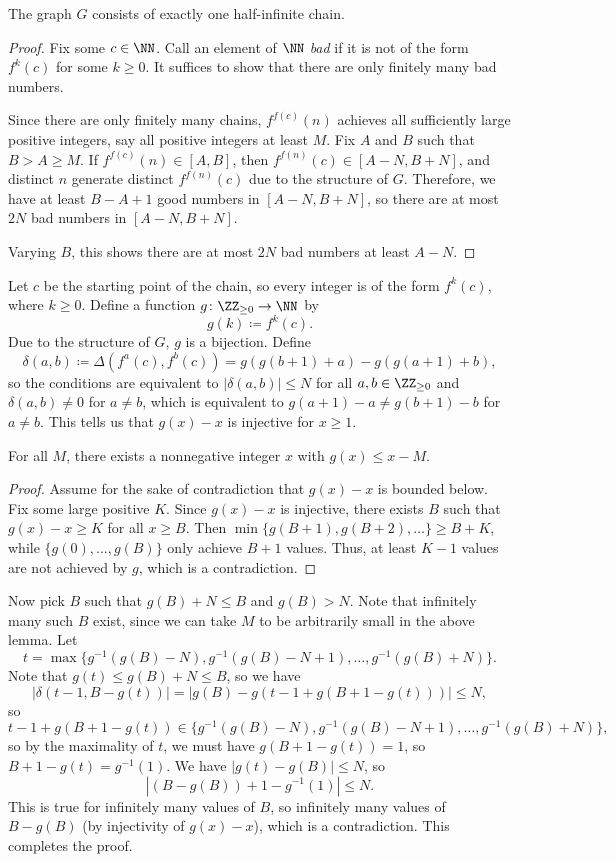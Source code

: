 \documentclass[11pt]{scrartcl}
\begin{document}
\begin{claim*}
  The graph $G$ consists of exactly one half-infinite chain.
\end{claim*}
\begin{proof}
  Fix some $c\in\NN$.
  Call an element of $\NN$ \textit{bad} if
  it is not of the form $f^k(c)$ for some $k\ge 0$.
  It suffices to show that there are only finitely many bad numbers.

  Since there are only finitely many chains, $f^{f(c)}(n)$ achieves all
  sufficiently large positive integers, say all positive integers at least $M$.
  Fix $A$ and $B$ such that $B>A\ge M$.
  If $f^{f(c)}(n)\in[A,B]$, then $f^{f(n)}(c)\in[A-N,B+N]$,
  and distinct $n$ generate distinct $f^{f(n)}(c)$ due to the structure of $G$.
  Therefore, we have at least $B-A+1$ good numbers in $[A-N,B+N]$,
  so there are at most $2N$ bad numbers in $[A-N,B+N]$.

  Varying $B$, this shows there are at most $2N$ bad numbers at least $A-N$.
\end{proof}

Let $c$ be the starting point of the chain,
so every integer is of the form $f^k(c)$, where $k\geq 0$.
Define a function $g \colon \ZZ_{\ge 0}\to\NN$
by \[ g(k) \coloneqq f^k(c). \]
Due to the structure of $G$, $g$ is a bijection.
Define
\[\delta(a,b) \coloneqq \Delta(f^a(c),f^b(c)) = g(g(b+1)+a)-g(g(a+1)+b),\]
so the conditions are equivalent to $|\delta(a,b)|\le N$
for all $a,b\in\ZZ_{\ge 0}$ and $\delta(a,b)\ne 0$ for $a\ne b$,
which is equivalent to $g(a+1)-a\ne g(b+1)-b$ for $a\ne b$.
This tells us that $g(x)-x$ is injective for $x\ge 1$.

\begin{lemma*}
  For all $M$, there exists a nonnegative integer $x$ with $g(x)\leq x-M$.
\end{lemma*}
\begin{proof}
  Assume for the sake of contradiction that $g(x)-x$ is bounded below.
  Fix some large positive $K$.
  Since $g(x)-x$ is injective,
  there exists $B$ such that $g(x)-x\geq K$ for all $x\geq B$.
  Then $\min \{g(B+1),g(B+2),\dots\} \ge B+K$,
  while $\{g(0),\dots,g(B)\}$ only achieve $B+1$ values.
  Thus, at least $K-1$ values are not achieved by $g$, which is a contradiction.
\end{proof}

Now pick $B$ such that $g(B)+N\le B$ and $g(B) > N$.
Note that infinitely many such $B$ exist,
since we can take $M$ to be arbitrarily small in the above lemma.
Let
\[ t = \max \{g^{-1}(g(B)-N), g^{-1}(g(B)-N+1), \dots, g^{-1}(g(B)+N)\}. \]
Note that $g(t)\le g(B)+N\le B$, so we have
\[ |\delta(t-1,B-g(t))| = |g(B)-g(t-1+g(B+1-g(t)))| \le N, \]
so
\[ t-1+g(B+1-g(t)) \in
  \{g^{-1}(g(B)-N),g^{-1}(g(B)-N+1),\dots,g^{-1}(g(B)+N)\},\]
so by the maximality of $t$, we must have $g(B+1-g(t))=1$,
so $B+1-g(t)=g^{-1}(1)$.
We have $|g(t)-g(B)|\le N$, so
\[|(B-g(B))+1-g^{-1}(1)|\le N.\]
This is true for infinitely many values of $B$,
so infinitely many values of $B-g(B)$ (by injectivity of $g(x)-x$),
which is a contradiction.
This completes the proof.
\pagebreak
\end{document}
